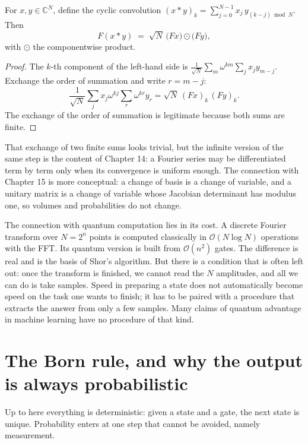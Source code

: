 \begin{teorema}
For $x,y\in\mathbb{C}^{N}$, define the cyclic convolution
$(x*y)_k=\sum_{j=0}^{N-1}x_j\,y_{(k-j)\bmod N}$. Then
\begin{equation}
F(x*y) \;=\; \sqrt{N}\,\bigl(Fx\bigr)\odot\bigl(Fy\bigr),
\end{equation}
with $\odot$ the componentwise product.
\end{teorema}

\begin{proof}
The $k$-th component of the left-hand side is
$\frac{1}{\sqrt{N}}\sum_m\omega^{km}\sum_j x_j y_{m-j}$. Exchange the order of summation
and write $r=m-j$:
\[
\frac{1}{\sqrt{N}}\sum_j x_j\omega^{kj}\sum_r\omega^{kr}y_r
=\sqrt{N}\,(Fx)_k\,(Fy)_k .
\]
The exchange of the order of summation is legitimate because both sums are finite.
\end{proof}

That exchange of two finite sums looks trivial, but the infinite version of the same step
is the content of Chapter 14: a Fourier series may be differentiated term by term only
when its convergence is uniform enough. The connection with Chapter 15 is more
conceptual: a change of basis is a change of variable, and a unitary matrix is a change of
variable whose Jacobian determinant has modulus one, so volumes and probabilities do not
change.

The connection with quantum computation lies in its cost. A discrete Fourier transform
over $N=2^{n}$ points is computed classically in $\mathcal{O}(N\log N)$ operations with
the FFT. Its quantum version is built from $\mathcal{O}(n^{2})$ gates. The difference is
real and is the basis of Shor's algorithm. But there is a condition that is often left
out: once the transform is finished, we cannot read the $N$ amplitudes, and all we can do
is take samples. Speed in preparing a state does not automatically become speed on the
task one wants to finish; it has to be paired with a procedure that extracts the answer
from only a few samples. Many claims of quantum advantage in machine learning have no
procedure of that kind.

\section{The Born rule, and why the output is always probabilistic}

Up to here everything is deterministic: given a state and a gate, the next state is
unique. Probability enters at one step that cannot be avoided, namely measurement.

